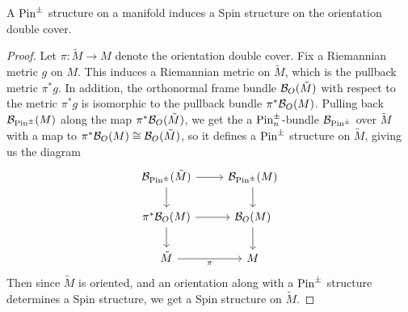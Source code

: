 %
\begin{thm}
A $\mathrm{Pin}^\pm$ structure on a manifold induces a Spin structure on the orientation
double cover.
\end{thm}
%
\begin{proof}
Let $ \pi : \tilde{M} \to M$ denote the orientation double cover. Fix a Riemannian
metric $g$ on $M$. This induces a Riemannian metric on $\tilde{M}$, which
is the pullback metric $\pi^*g$. In addition, the orthonormal frame bundle
$\mathcal{B}_O(\tilde{M})$ with respect to the metric $\pi^*g$ is isomorphic to the
pullback bundle $\pi^*\mathcal{B}_O(M)$. Pulling back $\mathcal{B}_{\mathrm{Pin}^\pm}(M)$ along the map
$\pi^*\mathcal{B}_O(\tilde{M})$, we get the a $\mathrm{Pin}^\pm_n$-bundle $\mathcal{B}_{\mathrm{Pin}^\pm}$ over
$\tilde{M}$ with a map to $\pi^*\mathcal{B}_{O}(M) \cong \mathcal{B}_O(\tilde{M})$, so it defines
a $\mathrm{Pin}^\pm$ structure on $\tilde{M}$, giving us the diagram
\[\begin{tikzcd}
\B_{\Pin^\pm}(\tilde{M}) \ar[d]\ar[r] & \B_{\Pin^\pm}(M) \ar[d]\\
\pi^*\B_O(M) \ar[d]\ar[r] & \B_O(M) \ar[d]\\
\tilde{M} \ar[r, "\pi"'] & M
\end{tikzcd}\]
Then since $\tilde{M}$ is oriented, and an orientation along with a $\mathrm{Pin}^\pm$
structure determines a Spin structure, we get a Spin structure on $\tilde{M}$.
\end{proof}
%